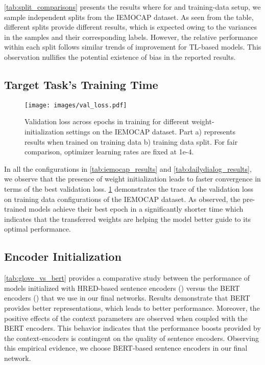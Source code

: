 \documentclass[preprint,3pt]{elsarticle}
\begin{document}
\cref{tab:split_comparisons} presents the results where for  and  training-data setup, we sample  independent splits from the IEMOCAP dataset. As seen from the table, different splits provide different results, which is expected owing to the variances in the samples and their corresponding labels. However, the relative performance within each split follows similar trends of improvement for TL-based models. This observation nullifies the potential existence of bias in the reported results.


\subsection{Target Task's Training Time}

\begin{figure}[h]
    \centering
	\texttt{[image: images/val\_loss.pdf]}
	\caption{\footnotesize{Validation loss across epochs in training for different weight-initialization settings on the IEMOCAP dataset. Part a) represents results when trained on  training data b)  training data split. For fair comparison, optimizer learning rates are fixed at 1e-4.}}
	\label{fig:val_loss}
\end{figure}

In all the configurations in \cref{tab:iemocap_results} and \ref{tab:dailydialog_results}, we observe that the presence of  weight initialization leads to faster convergence in terms of the best validation loss. \cref{fig:val_loss} demonstrates the trace of the validation loss on training data configurations of the IEMOCAP dataset. As observed, the pre-trained models achieve their best epoch in a significantly shorter time which indicates that the transferred weights are helping the model better guide to its optimal performance. 

\subsection{Encoder Initialization}

\cref{tab:glove_vs_bert} provides a comparative study between the performance of models initialized with HRED-based sentence encoders () versus the BERT encoders () that we use in our final networks. Results demonstrate that BERT provides better representations, which leads to better performance. Moreover, the positive effects of the context parameters are observed when coupled with the BERT encoders. This behavior indicates that the performance boosts provided by the context-encoders is contingent on the quality of sentence encoders. Observing this empirical evidence, we choose BERT-based sentence encoders in our final network.
\end{document}
